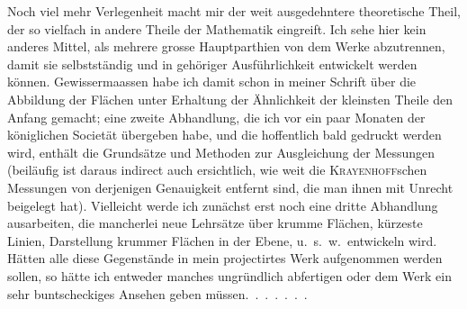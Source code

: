 \par\noindent\hspace*{\parindent}Noch viel mehr Verlegenheit macht mir der weit ausgedehntere theoretische Theil, der so vielfach in andere Theile der Mathematik eingreift.
Ich sehe hier kein anderes Mittel, als mehrere grosse Hauptparthien von dem Werke abzutrennen, damit sie selbstständig und in gehöriger Ausführlichkeit entwickelt werden können.
Gewissermaassen habe ich damit schon in meiner Schrift über die Abbildung der Flächen unter Erhaltung der Ähnlichkeit der kleinsten Theile den Anfang gemacht; eine zweite Abhandlung, die ich vor ein paar Monaten der königlichen Societät übergeben habe, und die hoffentlich bald gedruckt werden wird, enthält die Grundsätze und Methoden zur Ausgleichung der Messungen (beiläufig ist daraus indirect auch ersichtlich, wie weit die \textsc{Krayenhoff}schen Messungen von derjenigen Genauigkeit entfernt sind, die man ihnen mit Unrecht beigelegt hat).
Vielleicht werde ich zunächst erst noch eine dritte Abhandlung ausarbeiten, die mancherlei neue Lehrsätze über krumme Flächen, kürzeste Linien, Darstellung krummer Flächen in der Ebene, u.\ s.\ w.\ entwickeln wird.
Hätten alle diese Gegenstände in mein projectirtes Werk aufgenommen werden sollen, so hätte ich entweder manches ungründlich abfertigen oder dem Werk ein sehr buntscheckiges Ansehen geben müssen.\ .\ .\ .\ .\ .\ .
